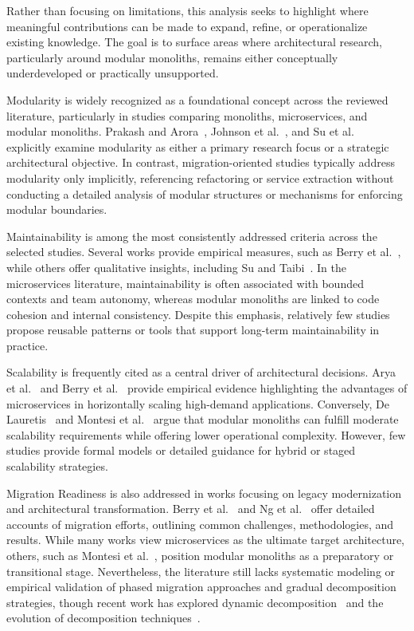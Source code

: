 Rather than focusing on limitations, this analysis seeks to highlight where meaningful contributions can be made to expand, refine, or operationalize existing knowledge. The goal is to surface areas where architectural research, particularly around modular monoliths, remains either conceptually underdeveloped or practically unsupported.


Modularity is widely recognized as a foundational concept across the reviewed literature, particularly in studies comparing monoliths, microservices, and modular monoliths. Prakash and Arora~\cite{prakash2024systematic}, Johnson et al.~\cite{johnson2024serviceweaver}, and Su et al.~\cite{su2024from} explicitly examine modularity as either a primary research focus or a strategic architectural objective. In contrast, migration-oriented studies typically address modularity only implicitly, referencing refactoring or service extraction without conducting a detailed analysis of modular structures or mechanisms for enforcing modular boundaries.

Maintainability is among the most consistently addressed criteria across the selected studies. Several works provide empirical measures, such as Berry et al.~\cite{berry2024isItWorth}, while others offer qualitative insights, including Su and Taibi~\cite{su2024from}. In the microservices literature, maintainability is often associated with bounded contexts and team autonomy, whereas modular monoliths are linked to code cohesion and internal consistency. Despite this emphasis, relatively few studies propose reusable patterns or tools that support long-term maintainability in practice.

Scalability is frequently cited as a central driver of architectural decisions. Arya et al.~\cite{arya2024beyond} and Berry et al.~\cite{berry2024isItWorth} provide empirical evidence highlighting the advantages of microservices in horizontally scaling high-demand applications. Conversely, De Lauretis~\cite{deLauretis2019from} and Montesi et al.~\cite{montesi2021sliceable} argue that modular monoliths can fulfill moderate scalability requirements while offering lower operational complexity. However, few studies provide formal models or detailed guidance for hybrid or staged scalability strategies.

Migration Readiness is also addressed in works focusing on legacy modernization and architectural transformation. Berry et al.~\cite{berry2024isItWorth} and Ng et al.~\cite{ng2024migrating} offer detailed accounts of migration efforts, outlining common challenges, methodologies, and results. While many works view microservices as the ultimate target architecture, others, such as Montesi et al.~\cite{montesi2021sliceable}, position modular monoliths as a preparatory or transitional stage. Nevertheless, the literature still lacks systematic modeling or empirical validation of phased migration approaches and gradual decomposition strategies, though recent work has explored dynamic decomposition~\cite{nassima2024dynamic} and the evolution of decomposition techniques~\cite{oumoussa2024evolution}.

